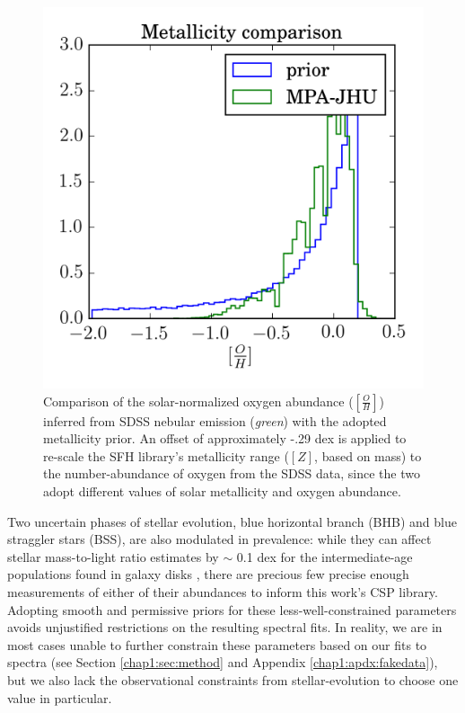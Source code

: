 \begin{figure}
    \centering
    \includegraphics[width=\columnwidth]{metallicity-prior}
    \caption[Comparison of SDSS nebular metallicity distribution with training data stellar metallicity distribution]{\fixspacing Comparison of the solar-normalized oxygen abundance ($[\frac{O}{H}]$) inferred from SDSS nebular emission (\textit{green}) with the adopted metallicity prior. An offset of approximately -.29 dex is applied to re-scale the  SFH library's metallicity range ($[Z]$, based on mass) to the number-abundance of oxygen from the SDSS data, since the two adopt different values of solar metallicity and oxygen abundance.}
    \label{fig:metallicity_prior}
\end{figure}

Two uncertain phases of stellar evolution, blue horizontal branch (BHB) and blue straggler stars (BSS), are also modulated in prevalence: while they can affect stellar mass-to-light ratio estimates by $\sim$ 0.1 dex for the intermediate-age populations found in galaxy disks \citep{fsps_1}, there are precious few precise enough measurements of either of their abundances to inform this work's CSP library. Adopting smooth and permissive priors for these less-well-constrained parameters avoids unjustified restrictions on the resulting spectral fits. In reality, we are in most cases unable to further constrain these parameters based on our fits to spectra (see Section \ref{chap1:sec:method} and Appendix \ref{chap1:apdx:fakedata}), but we also lack the observational constraints from stellar-evolution to choose one value in particular.

